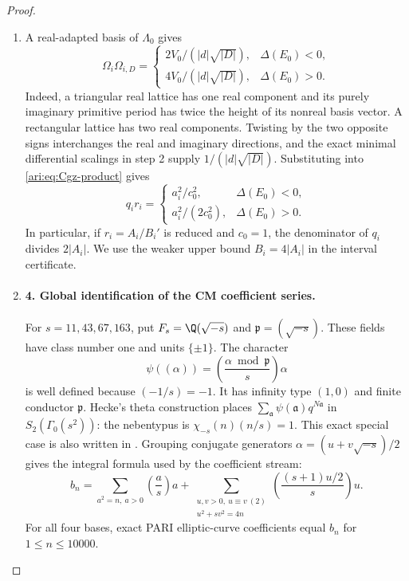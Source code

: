 \begin{proof}
\begin{enumerate}[label=\arabic*.,leftmargin=*]
\item A real-adapted basis of $\Lambda_0$ gives
\[
 \Omega_i\Omega_{i,D}=
 \begin{cases}
 2V_0/(|d|\sqrt{|D|}),&\Delta(E_0)<0,\\
 4V_0/(|d|\sqrt{|D|}),&\Delta(E_0)>0.
 \end{cases}
\]
Indeed, a triangular real lattice has one real component and its
purely imaginary primitive period has twice the height of its
nonreal basis vector. A rectangular lattice has two real
components. Twisting by the two opposite signs interchanges the
real and imaginary directions, and the exact minimal differential
scalings in step 2 supply $1/(|d|\sqrt{|D|})$.
Substituting into \eqref{ari:eq:Cgz-product} gives
\begin{equation}\label{ari:eq:Cgz-denominator}
 q_ir_i=
 \begin{cases}
 a_i^2/c_0^2,&\Delta(E_0)<0,\\
 a_i^2/(2c_0^2),&\Delta(E_0)>0.
 \end{cases}
\end{equation}
In particular, if $r_i=A_i/B_i'$ is reduced and $c_0=1$, the
denominator of $q_i$ divides $2|A_i|$. We use the weaker upper
bound $B_i=4|A_i|$ in the interval certificate.

\item \paragraph{4. Global identification of the CM coefficient series.}
For $s=11,43,67,163$, put
$F_s=\Q(\sqrt{-s})$ and $\mathfrak p=(\sqrt{-s})$.
These fields have class number one and units $\{\pm1\}$.
The character
\[
 \psi((\alpha))=
  \left(\frac{\alpha\bmod\mathfrak p}{s}\right)\alpha
\]
is well defined because $(-1/s)=-1$. It has infinity type $(1,0)$
and finite conductor $\mathfrak p$. Hecke's theta construction
places $\sum_{\mathfrak a}\psi(\mathfrak a)q^{N\mathfrak a}$ in
$S_2(\Gamma_0(s^2))$: the nebentypus is
$\chi_{-s}(n)(n/s)=1$. This exact special case is also written
in \citet[\S3, pp.~4--5]{CrDarmon2009}. Grouping conjugate
generators $\alpha=(u+v\sqrt{-s})/2$ gives the integral formula
used by the coefficient stream:
\[
 b_n=\sum_{a^2=n,\ a>0}\left(\frac as\right)a
  +\sum_{\substack{u,v>0,\ u\equiv v\ (2)\\u^2+sv^2=4n}}
       \left(\frac{(s+1)u/2}{s}\right)u.
\]
For all four bases, exact PARI elliptic-curve coefficients equal
$b_n$ for $1\leq n\leq10000$.


\end{enumerate}
\end{proof}
